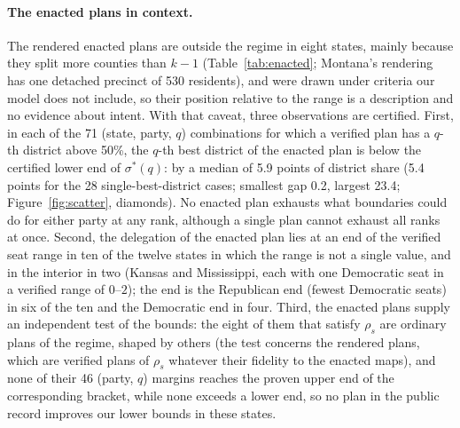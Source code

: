 \paragraph{The enacted plans in context.}
The rendered enacted plans are outside the regime in eight states, mainly because they split more counties than $k-1$ (Table~\ref{tab:enacted}; Montana's rendering has one detached precinct of 530 residents), and were drawn under criteria our model does not include, so their position relative to the range is a description and no evidence about intent. With that caveat, three observations are certified. First, in each of the 71 (state, party, $q$) combinations for which a verified plan has a $q$-th district above 50\%, the $q$-th best district of the enacted plan is below the certified lower end of $\sigma^*(q)$: by a median of 5.9 points of district share (5.4 points for the 28 single-best-district cases; smallest gap 0.2, largest 23.4; Figure~\ref{fig:scatter}, diamonds). No enacted plan exhausts what boundaries could do for either party at any rank, although a single plan cannot exhaust all ranks at once. Second, the delegation of the enacted plan lies at an end of the verified seat range in ten of the twelve states in which the range is not a single value, and in the interior in two (Kansas and Mississippi, each with one Democratic seat in a verified range of $0$--$2$); the end is the Republican end (fewest Democratic seats) in six of the ten and the Democratic end in four. Third, the enacted plans supply an independent test of the bounds: the eight of them that satisfy $\rho_s$ are ordinary plans of the regime, shaped by others (the test concerns the rendered plans, which are verified plans of $\rho_s$ whatever their fidelity to the enacted maps), and none of their 46 (party, $q$) margins reaches the proven upper end of the corresponding bracket, while none exceeds a lower end, so no plan in the public record improves our lower bounds in these states.
